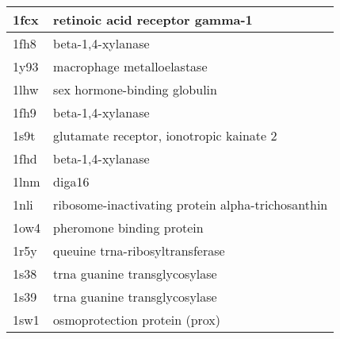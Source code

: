\begin{tabular}{|l|l|}
\hline
1fcx & retinoic acid receptor gamma-1 \\
\hline
1fh8 & beta-1,4-xylanase \\
\hline
1y93 & macrophage metalloelastase \\
\hline
1lhw & sex hormone-binding globulin \\
\hline
1fh9 & beta-1,4-xylanase \\
\hline
1s9t & glutamate receptor, ionotropic kainate 2 \\
\hline
1fhd & beta-1,4-xylanase \\
\hline
1lnm & diga16 \\
\hline
1nli & ribosome-inactivating protein alpha-trichosanthin \\
\hline
1ow4 & pheromone binding protein \\
\hline
1r5y & queuine trna-ribosyltransferase \\
\hline
1s38 & trna guanine transglycosylase \\
\hline
1s39 & trna guanine transglycosylase \\
\hline
1sw1 & osmoprotection protein (prox) \\
\hline
\end{tabular}